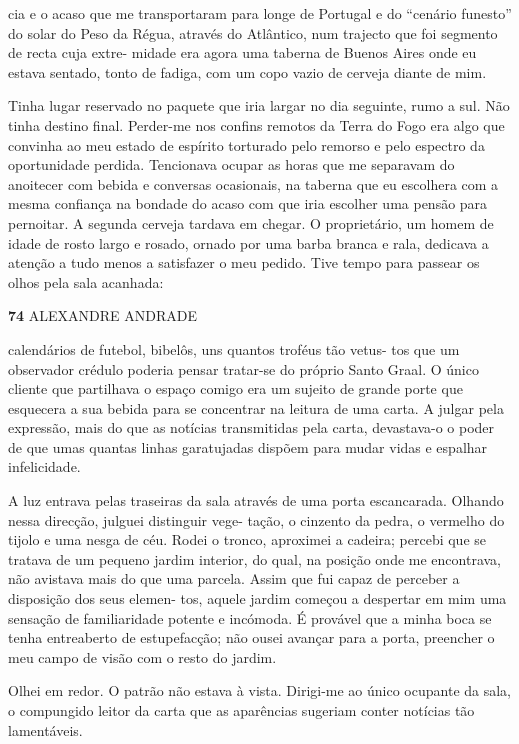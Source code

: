 cia e o acaso que me transportaram para longe de Portugal e do ``cenário
funesto'' do solar do Peso da Régua, através do Atlântico, num trajecto
que foi segmento de recta cuja extre- midade era agora uma taberna de
Buenos Aires onde eu estava sentado, tonto de fadiga, com um copo vazio
de cerveja diante de mim.

Tinha lugar reservado no paquete que iria largar no dia seguinte, rumo a
sul. Não tinha destino final. Perder-me nos confins remotos da Terra do
Fogo era algo que convinha ao meu estado de espírito torturado pelo
remorso e pelo espectro da oportunidade perdida. Tencionava ocupar as
horas que me separavam do anoitecer com bebida e conversas ocasionais,
na taberna que eu escolhera com a mesma confiança na bondade do acaso
com que iria escolher uma pensão para pernoitar. A segunda cerveja
tardava em chegar. O proprietário, um homem de idade de rosto largo e
rosado, ornado por uma barba branca e rala, dedicava a atenção a tudo
menos a satisfazer o meu pedido. Tive tempo para passear os olhos pela
sala acanhada:

\textbf{74 }ALEXANDRE ANDRADE

calendários de futebol, bibelôs, uns quantos troféus tão vetus- tos que
um observador crédulo poderia pensar tratar-se do próprio Santo Graal. O
único cliente que partilhava o espaço comigo era um sujeito de grande
porte que esquecera a sua bebida para se concentrar na leitura de uma
carta. A julgar pela expressão, mais do que as notícias transmitidas
pela carta, devastava-o o poder de que umas quantas linhas garatujadas
dispõem para mudar vidas e espalhar infelicidade.

A luz entrava pelas traseiras da sala através de uma porta escancarada.
Olhando nessa direcção, julguei distinguir vege- tação, o cinzento da
pedra, o vermelho do tijolo e uma nesga de céu. Rodei o tronco,
aproximei a cadeira; percebi que se tratava de um pequeno jardim
interior, do qual, na posição onde me encontrava, não avistava mais do
que uma parcela. Assim que fui capaz de perceber a disposição dos seus
elemen- tos, aquele jardim começou a despertar em mim uma sensação de
familiaridade potente e incómoda. É provável que a minha boca se tenha
entreaberto de estupefacção; não ousei avançar para a porta, preencher o
meu campo de visão com o resto do jardim.

Olhei em redor. O patrão não estava à vista. Dirigi-me ao único ocupante
da sala, o compungido leitor da carta que as aparências sugeriam conter
notícias tão lamentáveis.

